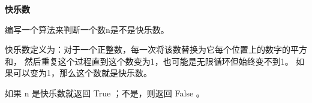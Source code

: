 \textbf{快乐数}\par

编写一个算法来判断一个数n是不是快乐数。\par

快乐数定义为：对于一个正整数，每一次将该数替换为它每个位置上的数字的平方和，
然后重复这个过程直到这个数变为1，也可能是无限循环但始终变不到1。
如果可以变为1，那么这个数就是快乐数。\par

如果 n 是快乐数就返回 True ；不是，则返回 False 。\par
